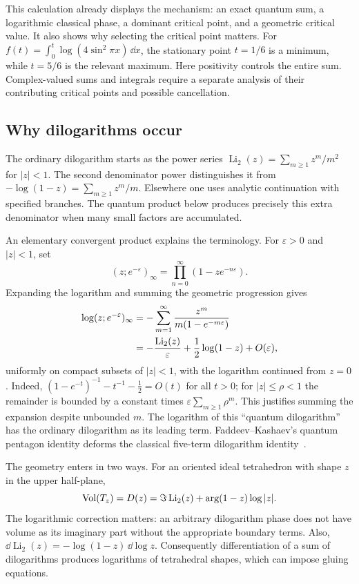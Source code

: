 This calculation already displays the mechanism: an exact quantum
sum, a logarithmic classical phase, a dominant critical point,
and a geometric critical value. It also shows why selecting the
critical point matters. For
$f(t)=\int_0^t\log(4\sin^2\pi x)\,\dd x$, the stationary point
$t=1/6$ is a minimum, while $t=5/6$ is the relevant maximum.
Here positivity controls the entire sum. Complex-valued sums and
integrals require a separate analysis of their contributing
critical points and possible cancellation.

\subsection{Why dilogarithms occur}
\label{sec:introdilog}

The ordinary dilogarithm starts as the power series
$\operatorname{Li}_2(z)=\sum_{m\ge1}z^m/m^2$ for $|z|<1$.
The second denominator power distinguishes it from
$-\log(1-z)=\sum_{m\ge1}z^m/m$. Elsewhere one uses analytic
continuation with specified branches. The quantum product below
produces precisely this extra denominator when many small factors
are accumulated.

An elementary convergent product explains the terminology. For
$\varepsilon>0$ and $|z|<1$, set
\[
 (z;e^{-\varepsilon})_\infty
      =\prod_{n=0}^\infty(1-ze^{-n\varepsilon}).
\]
Expanding the logarithm and summing the geometric progression gives
\begin{align}
 \log(z;e^{-\varepsilon})_\infty
 &=-\sum_{m=1}^\infty
       \frac{z^m}{m(1-e^{-m\varepsilon})}\notag\\
 &=-\frac{\operatorname{Li}_2(z)}{\varepsilon}
       +\frac12\log(1-z)+O(\varepsilon),
 \label{eq:introqpochhammer}
\end{align}
uniformly on compact subsets of $|z|<1$, with the logarithm
continued from $z=0$. Indeed,
$(1-e^{-t})^{-1}-t^{-1}-\tfrac12=O(t)$ for all $t>0$;
for $|z|\le\rho<1$ the remainder is bounded by a constant times
$\varepsilon\sum_{m\ge1}\rho^m$. This justifies summing the
expansion despite unbounded $m$.
The logarithm of this ``quantum dilogarithm'' has the ordinary
dilogarithm as its leading term. Faddeev--Kashaev's quantum
pentagon identity deforms the classical five-term dilogarithm
identity~\cite{FaddeevKashaev}.

The geometry enters in two ways. For an oriented ideal tetrahedron
with shape $z$ in the upper half-plane,
\begin{equation}
 \operatorname{Vol}(T_z)=D(z)
 =\Im\operatorname{Li}_2(z)+\arg(1-z)\log|z|.
 \label{eq:introBlochWigner}
\end{equation}
The logarithmic correction matters: an arbitrary dilogarithm phase
does not have volume as its imaginary part without the appropriate
boundary terms. Also,
$\dd\operatorname{Li}_2(z)=-\log(1-z)\,\dd\log z$.
Consequently differentiation of a sum of dilogarithms produces
logarithms of tetrahedral shapes, which can impose gluing equations.

